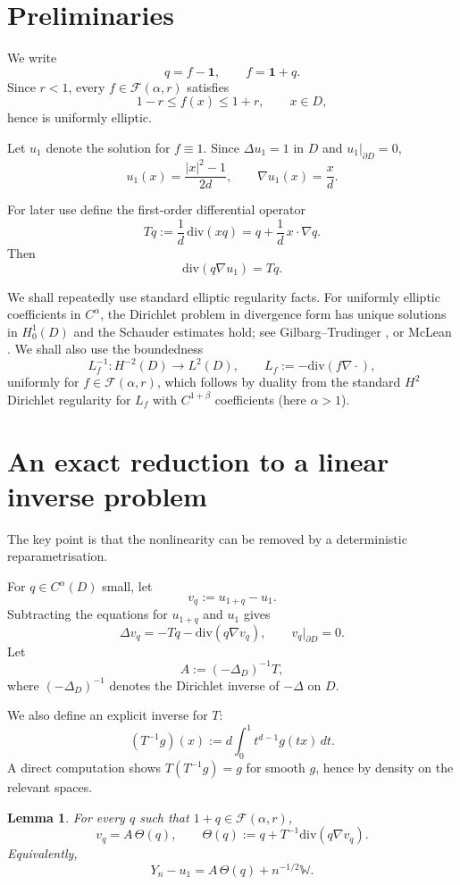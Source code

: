 \documentclass[11pt]{article}
\newtheorem{lemma}[theorem]{Lemma}
\newcommand{\one}{\mathbf 1}
\newcommand{\diver}{\mathrm{div}}
\begin{document}
\section{Preliminaries}

We write
\[
q=f-\one,\qquad f=\one+q.
\]
Since $r<1$, every $f\in \mathcal F(\alpha,r)$ satisfies
\[
1-r\le f(x)\le 1+r,\qquad x\in D,
\]
hence is uniformly elliptic.

Let $u_1$ denote the solution for $f\equiv 1$. Since $\Delta u_1=1$ in $D$ and $u_1|_{\partial D}=0$,
\[
u_1(x)=\frac{|x|^2-1}{2d},\qquad \nabla u_1(x)=\frac{x}{d}.
\]

For later use define the first-order differential operator
\[
Tq:=\frac1d\,\diver(xq)=q+\frac1d\,x\cdot \nabla q.
\]
Then
\[
\diver(q\nabla u_1)=Tq.
\]

We shall repeatedly use standard elliptic regularity facts. For uniformly elliptic coefficients in $C^\alpha$, the Dirichlet problem in divergence form has unique solutions in $H^1_0(D)$ and the Schauder estimates hold; see Gilbarg--Trudinger \cite[Ch.~6, Ch.~8]{GT}, or McLean \cite[Ch.~4]{McLean}. We shall also use the boundedness
\[
L_f^{-1}:H^{-2}(D)\to L^2(D),
\qquad
L_f:=-\diver(f\nabla \cdot),
\]
uniformly for $f\in \mathcal F(\alpha,r)$, which follows by duality from the standard $H^2$ Dirichlet regularity for $L_f$ with $C^{1+\beta}$ coefficients (here $\alpha>1$).

\section{An exact reduction to a linear inverse problem}

The key point is that the nonlinearity can be removed by a deterministic reparametrisation.

For $q\in C^\alpha(D)$ small, let
\[
v_q:=u_{1+q}-u_1.
\]
Subtracting the equations for $u_{1+q}$ and $u_1$ gives
\[
\Delta v_q=-Tq-\diver(q\nabla v_q),\qquad v_q|_{\partial D}=0.
\]
Let
\[
A:=(-\Delta_D)^{-1}T,
\]
where $(-\Delta_D)^{-1}$ denotes the Dirichlet inverse of $-\Delta$ on $D$.

We also define an explicit inverse for $T$:
\[
(T^{-1}g)(x):=d\int_0^1 t^{d-1}g(tx)\,dt.
\]
A direct computation shows $T(T^{-1}g)=g$ for smooth $g$, hence by density on the relevant spaces.

\begin{lemma}\label{lem:exact-linearisation}
For every $q$ such that $1+q\in \mathcal F(\alpha,r)$,
\[
v_q=A\,\Theta(q),
\qquad
\Theta(q):=q+T^{-1}\diver(q\nabla v_q).
\]
Equivalently,
\[
Y_n-u_1=A\,\Theta(q)+n^{-1/2}\mathbb W.
\]
\end{lemma}
\end{document}
